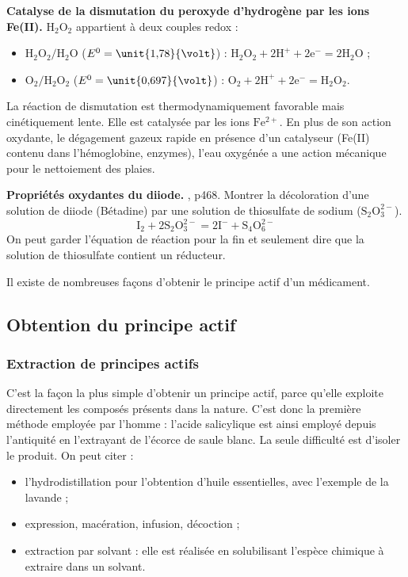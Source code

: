 \begin{experience}
\textbf{Catalyse de la dismutation du peroxyde d'hydrogène par les ions Fe(II).}
$\mathrm{H_2O_2}$ appartient à deux couples redox :
\begin{itemize}
\item $\mathrm{H_2O_2/H_2O}$ ($E^0 = \unit{1{,}78}{\volt}$) : $\mathrm{H_2O_2 + 2H^+ + 2e^- = 2H_2O}$ ;
\item $\mathrm{O_2/H_2O_2}$ ($E^0 = \unit{0{,}697}{\volt}$) : $\mathrm{O_2 + 2H^+ + 2e^- = H_2O_2}$.
\end{itemize}
La réaction de dismutation est thermodynamiquement favorable mais cinétiquement lente.
Elle est catalysée par les ions $\mathrm{Fe^{2+}}$.
En plus de son action oxydante, le dégagement gazeux rapide en présence d'un catalyseur (Fe(II) contenu dans l'hémoglobine, enzymes), l'eau oxygénée a une action mécanique pour le nettoiement des plaies.
\end{experience}

\begin{experience}
\textbf{Propriétés oxydantes du diiode.}
\cite{Dulaurans2012}, p468.
Montrer la décoloration d'une solution de diiode (Bétadine) par une solution de thiosulfate de sodium ($\mathrm{S_2O_3^{2-}}$).
\begin{equation}
\mathrm{I_2 + 2S_2O_3^{2-} = 2I^- + S_4O_6^{2-}}
\end{equation}
On peut garder l'équation de réaction pour la fin et seulement dire que la solution de thiosulfate contient un réducteur.
\end{experience}

\begin{transition}
Il existe de nombreuses façons d'obtenir le principe actif d'un médicament.
\end{transition}

\subsection{Obtention du principe actif}

\subsubsection{Extraction de principes actifs}

C'est la façon la plus simple d'obtenir un principe actif, parce qu'elle exploite directement les composés présents dans la nature.
C'est donc la première méthode employée par l'homme : l'acide salicylique est ainsi employé depuis l'antiquité en l'extrayant de l'écorce de saule blanc.
La seule difficulté est d'isoler le produit.
On peut citer :
\begin{itemize}
\item l'hydrodistillation pour l'obtention d'huile essentielles, avec l'exemple de la lavande ;
\item expression, macération, infusion, décoction ;
\item extraction par solvant \cite{Prevost2017} : elle est réalisée en solubilisant l'espèce chimique à extraire dans un solvant. 
\end{itemize}

